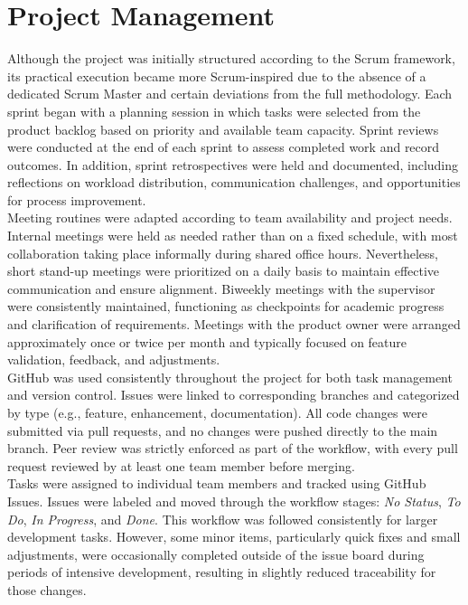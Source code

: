 \section{Project Management}
\label{sec:results-project-management}
Although the project was initially structured according to the Scrum framework, its practical execution became more Scrum-inspired due to the absence of a dedicated Scrum Master and certain deviations from the full methodology. Each sprint began with a planning session in which tasks were selected from the product backlog based on priority and available team capacity. Sprint reviews were conducted at the end of each sprint to assess completed work and record outcomes. In addition, sprint retrospectives were held and documented, including reflections on workload distribution, communication challenges, and opportunities for process improvement. \\

Meeting routines were adapted according to team availability and project needs. Internal meetings were held as needed rather than on a fixed schedule, with most collaboration taking place informally during shared office hours. Nevertheless, short stand-up meetings were prioritized on a daily basis to maintain effective communication and ensure alignment. Biweekly meetings with the supervisor were consistently maintained, functioning as checkpoints for academic progress and clarification of requirements. Meetings with the product owner were arranged approximately once or twice per month and typically focused on feature validation, feedback, and adjustments. \\

GitHub was used consistently throughout the project for both task management and version control. Issues were linked to corresponding branches and categorized by type (e.g., feature, enhancement, documentation). All code changes were submitted via pull requests, and no changes were pushed directly to the main branch. Peer review was strictly enforced as part of the workflow, with every pull request reviewed by at least one team member before merging. \\

Tasks were assigned to individual team members and tracked using GitHub Issues. Issues were labeled and moved through the workflow stages: \textit{No Status}, \textit{To Do}, \textit{In Progress}, and \textit{Done}. This workflow was followed consistently for larger development tasks. However, some minor items, particularly quick fixes and small adjustments, were occasionally completed outside of the issue board during periods of intensive development, resulting in slightly reduced traceability for those changes.\\

